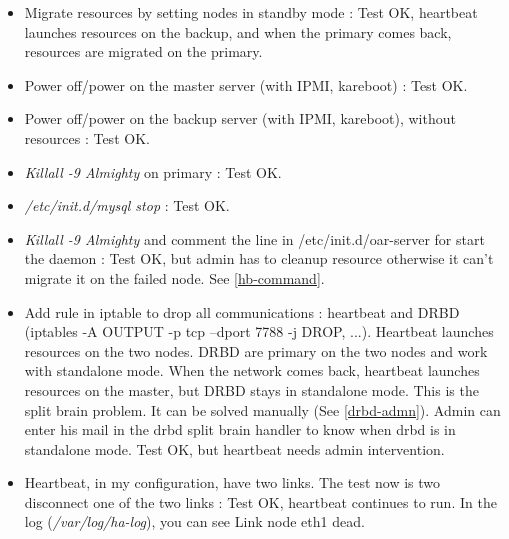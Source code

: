 \documentclass[a4paper,10pt]{report}
\begin{document}
\begin{itemize}
 \item Migrate resources by setting nodes in standby mode : Test OK, heartbeat launches resources on the backup, and when the primary comes back, resources are migrated on the primary.
 \item Power off/power on the master server (with IPMI, kareboot) : Test OK.
 \item Power off/power on the backup server (with IPMI, kareboot), without resources : Test OK.
 \item \textit{Killall -9 Almighty} on primary : Test OK.
 \item \textit{/etc/init.d/mysql stop} : Test OK.
 \item \textit{Killall -9 Almighty} and comment the line in /etc/init.d/oar-server for start the daemon : Test OK, but admin has to cleanup resource otherwise it can't migrate it on the failed node. See \ref{hb-command}.
 \item Add rule in iptable to drop all communications : heartbeat and DRBD (iptables -A OUTPUT -p tcp --dport 7788 -j DROP, ...). Heartbeat launches resources on the two nodes. DRBD are primary on the two nodes and work with standalone mode. When the network comes back, heartbeat launches resources on the master, but DRBD stays in standalone mode. This is the split brain problem. It can be solved manually (See \ref{drbd-admn}).
Admin can enter his mail in the drbd split brain handler to know when drbd is in standalone mode. Test OK, but heartbeat needs admin intervention.
 \item Heartbeat, in my configuration, have two links. The test now is two disconnect one of the two links : Test OK, heartbeat continues to run. In the log (\textit{/var/log/ha-log}), you can see Link node eth1 dead.
\end{itemize}
\end{document}
